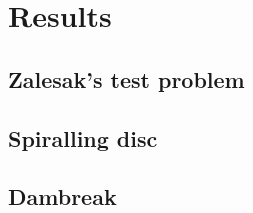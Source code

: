 \section{Results}

\subsection{Zalesak's test problem}

\subsection{Spiralling disc}

\subsection{Dambreak}


